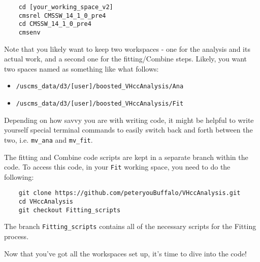 \begin{verbatim}
    cd [your_working_space_v2]
    cmsrel CMSSW_14_1_0_pre4
    cd CMSSW_14_1_0_pre4
    cmsenv
\end{verbatim}

\noindent Note that you likely want to keep two workspaces - one for the analysis and its actual work, and a second one for the fitting/Combine steps. Likely, you want two spaces named as something like what follows:

\begin{itemize}
    \item \verb|/uscms_data/d3/[user]/boosted_VHccAnalysis/Ana|
    \item \verb|/uscms_data/d3/[user]/boosted_VHccAnalysis/Fit|
\end{itemize}

\noindent Depending on how savvy you are with writing code, it might be helpful to write yourself special terminal commands to easily switch back and forth between the two, i.e. \verb|mv_ana| and \verb|mv_fit|.

The fitting and Combine code scripts are kept in a separate branch within the code. To access this code, in your \verb|Fit| working space, you need to do the following:

\begin{verbatim}
    git clone https://github.com/peteryouBuffalo/VHccAnalysis.git
    cd VHccAnalysis
    git checkout Fitting_scripts
\end{verbatim}

\noindent The branch \verb|Fitting_scripts| contains all of the necessary scripts for the Fitting process.

Now that you've got all the workspaces set up, it's time to dive into the code!